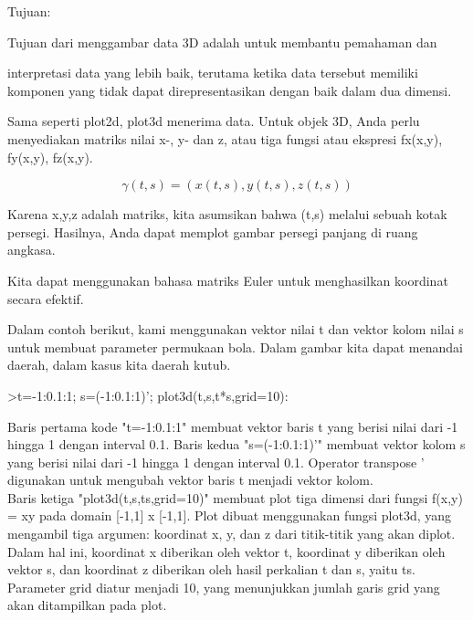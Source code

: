 \documentclass{article}
\begin{document}
\begin{eulernotebook}
\begin{eulercomment}
\begin{eulercomment}
\begin{eulercomment}
\begin{eulercomment}
\begin{eulercomment}
Tujuan:

\end{eulercomment}
\begin{eulerttcomment}
  Tujuan dari menggambar data 3D adalah untuk membantu pemahaman dan
\end{eulerttcomment}
\begin{eulercomment}
interpretasi data yang lebih baik, terutama ketika data tersebut
memiliki komponen yang tidak dapat direpresentasikan dengan baik dalam
dua dimensi.

Sama seperti plot2d, plot3d menerima data. Untuk objek 3D, Anda perlu
menyediakan matriks nilai x-, y- dan z, atau tiga fungsi atau ekspresi
fx(x,y), fy(x,y), fz(x,y).

\end{eulercomment}
\begin{eulerformula}
\[
\gamma(t,s) = (x(t,s),y(t,s),z(t,s))
\]
\end{eulerformula}
\begin{eulercomment}
Karena x,y,z adalah matriks, kita asumsikan bahwa (t,s) melalui sebuah
kotak persegi. Hasilnya, Anda dapat memplot gambar persegi panjang di
ruang angkasa.

Kita dapat menggunakan bahasa matriks Euler untuk menghasilkan
koordinat secara efektif.

Dalam contoh berikut, kami menggunakan vektor nilai t dan vektor kolom
nilai s untuk membuat parameter permukaan bola. Dalam gambar kita
dapat menandai daerah, dalam kasus kita daerah kutub.

\end{eulercomment}
\begin{eulerprompt}
>t=-1:0.1:1; s=(-1:0.1:1)'; plot3d(t,s,t*s,grid=10):
\end{eulerprompt}
\begin{eulercomment}
Baris pertama kode "t=-1:0.1:1" membuat vektor baris t yang berisi
nilai dari -1 hingga 1 dengan interval 0.1. Baris kedua
"s=(-1:0.1:1)'" membuat vektor kolom s yang berisi nilai dari -1
hingga 1 dengan interval 0.1. Operator transpose ' digunakan untuk
mengubah vektor baris t menjadi vektor kolom.\\
Baris ketiga "plot3d(t,s,ts,grid=10)" membuat plot tiga dimensi dari
fungsi f(x,y) = xy pada domain [-1,1] x [-1,1]. Plot dibuat
menggunakan fungsi plot3d, yang mengambil tiga argumen: koordinat x,
y, dan z dari titik-titik yang akan diplot. Dalam hal ini, koordinat x
diberikan oleh vektor t, koordinat y diberikan oleh vektor s, dan
koordinat z diberikan oleh hasil perkalian t dan s, yaitu ts.
Parameter grid diatur menjadi 10, yang menunjukkan jumlah garis grid
yang akan ditampilkan pada plot.


\end{eulercomment}
\end{eulercomment}
\end{eulercomment}
\end{eulercomment}
\end{eulercomment}
\end{eulernotebook}
\end{document}
